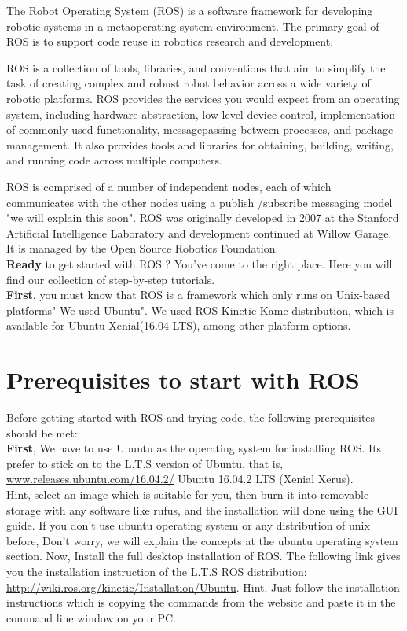 The Robot Operating System (ROS) is a software framework for developing robotic systems in a metaoperating system environment. The primary goal of ROS is to support code reuse in robotics research and development.

ROS is a collection of tools, libraries, and conventions that aim to simplify the task of creating complex and robust robot behavior across a wide variety of robotic platforms.
ROS provides the services you would expect from an operating system, including hardware abstraction, low-level device control, implementation of commonly-used functionality, messagepassing between processes, and package management.
It also provides tools and libraries for obtaining, building, writing, and running code across multiple computers. 

ROS is comprised of a number of independent nodes, each of which communicates with the other nodes using a publish /subscribe messaging model "we will explain this soon". 
ROS was originally developed in 2007 at the Stanford Artificial Intelligence Laboratory and development continued at Willow Garage. It is managed by the Open Source Robotics Foundation.\\


\textbf{Ready} to get started with ROS ? You’ve come to the right place. Here you will find our collection of step-by-step tutorials.\\


\textbf{First}, you must know that ROS is a framework which only runs on Unix-based platforms" We used Ubuntu". 
We used ROS Kinetic Kame distribution, which is available for Ubuntu Xenial(16.04 LTS), among other platform options.


 \section{Prerequisites to start with ROS}
 	Before getting started with ROS and trying code, the following prerequisites should be met:\\
 
 	\textbf{First}, We have to use Ubuntu as the operating system for installing ROS.
  	Its prefer to stick on to the L.T.S version of Ubuntu, that is, \url{www.releases.ubuntu.com/16.04.2/} Ubuntu 16.04.2 LTS (Xenial Xerus).\\
  	Hint, select an image which is suitable for you, then burn it into removable storage with any software like rufus, and the installation will done using the GUI guide.
  	If you don't use ubuntu operating system or any distribution of unix before, Don't worry, we will explain the concepts at the ubuntu operating system section. 
  	Now, Install the full desktop installation of ROS. The following link gives you the installation instruction of the L.T.S ROS distribution: \url{http://wiki.ros.org/kinetic/Installation/Ubuntu}. 
  	Hint, Just follow the installation instructions which is copying the commands from the website and paste it in the command line window on your PC.
